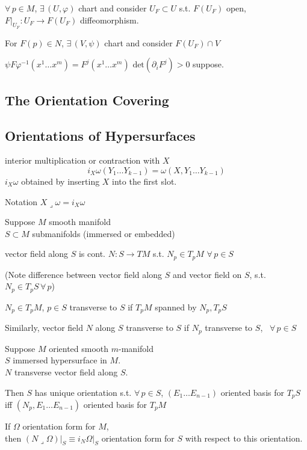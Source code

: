 $\forall \, p \in M$, $\exists \, (U, \varphi)$ chart and consider $U_F \subset U$ s.t. $F(U_F)$ open, $\left. F\right|_{U_F} : U_F \to F(U_F)$ diffeomorphism.  

For $F(p) \in N$, $\exists \, (V, \psi)$ chart and consider $F(U_F) \cap V$

$\psi F\varphi^{-1}(x^1 \dots x^m) = F^j(x^1 \dots x^m)$ \quad \quad $\text{det}{(\partial_i F^j)} >0$ suppose.  


\subsection*{The Orientation Covering}

\subsection*{Orientations of Hypersurfaces }

interior multiplication or contraction with $X$
\[
i_X\omega(Y_1 \dots Y_{k-1}) = \omega(X,Y_1 \dots Y_{k-1})
\]
$i_X \omega$ obtained by inserting $X$ into the first slot.

Notation $X \lrcorner \omega = i_X \omega$









Suppose $M$ smooth manifold \\
\phantom{Suppose} $S\subset M$ submanifolds (immersed or embedded)

vector field along $S$ is cont. $N: S \to TM$ s.t. $N_p \in T_pM$ \quad $\forall \, p \in S$

(Note difference between vector field along $S$ and vector field on $S$, s.t. $N_p \in T_pS \, \forall \, p$)

$N_p \in T_pM$, $p\in S$ transverse to $S$ if $T_pM$ spanned by $N_p, T_pS$

Similarly, vector field $N$ along $S$ transverse to $S$ if $N_p$ transverse to $S$, \, $\forall \, p \in S$




\begin{proposition} Suppose $M$ oriented smooth $m$-manifold \\
\phantom{Proposition 13.12 Suppose  } $S$ immersed hypersurface in $M$.  \\
\phantom{Proposition 13.12 Suppose  } $N$ transverse vector field along $S$.  

Then $S$ has unique orientation s.t. $\forall \, p \in S$, $(E_1 \dots E_{n-1})$ oriented basis for $T_pS$ iff $(N_p, E_1 \dots E_{n-1})$ oriented basis for $T_pM$

If $\Omega$ orientation form for $M$, \\
then $\left. (N \lrcorner \Omega) \right|_S \equiv \left. i_N\Omega \right|_S $ orientation form for $S$ with respect to this orientation.  
\end{proposition}

